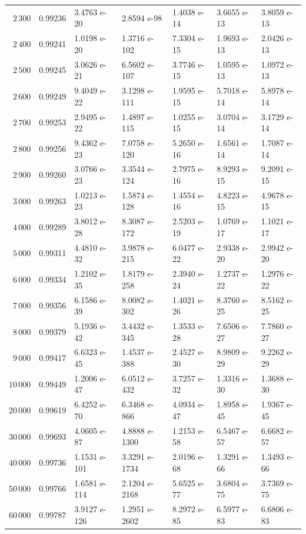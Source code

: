 \documentclass[10pt]{amsart}
\theoremstyle{definition}
\numberwithin{equation}{section}
\begin{document}
\begin{table}[h!]
{\begin{tabular}{|r|c|llll|l|}
$2\,300$ & 0.99236 & 3.4763 e-20 & 2.8594 e-98 & 1.4038 e-14 & 3.6655 e-13 & 3.8059 e-13 \\
$2\,400$ & 0.99241 & 1.0198 e-20 & 1.3716 e-102 & 7.3304 e-15 & 1.9693 e-13 & 2.0426 e-13 \\
$2\,500$ & 0.99245 & 3.0626 e-21 & 6.5602 e-107 & 3.7746 e-15 & 1.0595 e-13 & 1.0972 e-13 \\
$2\,600$ & 0.99249 & 9.4049 e-22 & 3.1298 e-111 & 1.9595 e-15 & 5.7018 e-14 & 5.8978 e-14 \\
$2\,700$ & 0.99253 & 2.9495 e-22 & 1.4897 e-115 & 1.0255 e-15 & 3.0704 e-14 & 3.1729 e-14 \\
$2\,800$ & 0.99256 & 9.4362 e-23 & 7.0758 e-120 & 5.2650 e-16 & 1.6561 e-14 & 1.7087 e-14 \\
$2\,900$ & 0.99260 & 3.0766 e-23 & 3.3544 e-124 & 2.7975 e-16 & 8.9293 e-15 & 9.2091 e-15 \\
$3\,000$ & 0.99263 & 1.0213 e-23 & 1.5874 e-128 & 1.4554 e-16 & 4.8223 e-15 & 4.9678 e-15 \\
$4\,000$ & 0.99289 & 3.8012 e-28 & 8.3087 e-172 & 2.5203 e-19 & 1.0769 e-17 & 1.1021 e-17 \\
$5\,000$ & 0.99311 & 4.4810 e-32 & 3.9878 e-215 & 6.0477 e-22 & 2.9338 e-20 & 2.9942 e-20 \\
$6\,000$ & 0.99334 & 1.2102 e-35 & 1.8179 e-258 & 2.3940 e-24 & 1.2737 e-22 & 1.2976 e-22 \\
$7\,000$ & 0.99356 & 6.1586 e-39 & 8.0082 e-302 & 1.4021 e-26 & 8.3760 e-25 & 8.5162 e-25 \\
$8\,000$ & 0.99379 & 5.1936 e-42 & 3.4432 e-345 & 1.3533 e-28 & 7.6506 e-27 & 7.7860 e-27 \\
$9\,000$ & 0.99417 & 6.6323 e-45 & 1.4537 e-388 & 2.4527 e-30 & 8.9809 e-29 & 9.2262 e-29 \\
$10\,000$ & 0.99449 & 1.2006 e-47 & 6.0512 e-432 & 3.7257 e-32 & 1.3316 e-30 & 1.3688 e-30 \\
$20\,000$ & 0.99619 & 6.4252 e-70 & 6.3468 e-866 & 4.0934 e-47 & 1.8958 e-45 & 1.9367 e-45 \\
$30\,000$ & 0.99693 & 4.0605 e-87 & 4.8888 e-1300 & 1.2153 e-58 & 6.5467 e-57 & 6.6682 e-57 \\
$40\,000$ & 0.99736 & 1.1531 e-101 & 3.3291 e-1734 & 2.0196 e-68 & 1.3291 e-66 & 1.3493 e-66 \\
$50\,000$ & 0.99766 & 1.6581 e-114 & 2.1204 e-2168 & 5.6525 e-77 & 3.6804 e-75 & 3.7369 e-75 \\
$60\,000$ & 0.99787 & 3.9127 e-126 & 1.2951 e-2602 & 8.2972 e-85 & 6.5977 e-83 & 6.6806 e-83 \\

\end{tabular}}
\end{table}
\end{document}
